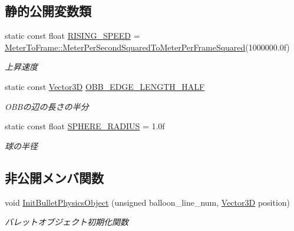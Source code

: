 \subsection*{静的公開変数類}
\begin{DoxyCompactItemize}
\item 
static const float \mbox{\hyperlink{class_balloon_a206b548c1ee7cf44616dbd2a0d7cc758}{R\+I\+S\+I\+N\+G\+\_\+\+S\+P\+E\+ED}} = \mbox{\hyperlink{class_meter_to_frame_ac3292be31b35e97027a65b4c74763ebe}{Meter\+To\+Frame\+::\+Meter\+Per\+Second\+Squared\+To\+Meter\+Per\+Frame\+Squared}}(1000000.\+0f)
\begin{DoxyCompactList}\small\item\em 上昇速度 \end{DoxyCompactList}\item 
static const \mbox{\hyperlink{class_vector3_d}{Vector3D}} \mbox{\hyperlink{class_balloon_a72e9f550154e31339200686a7b9dcdc2}{O\+B\+B\+\_\+\+E\+D\+G\+E\+\_\+\+L\+E\+N\+G\+T\+H\+\_\+\+H\+A\+LF}}
\begin{DoxyCompactList}\small\item\em O\+B\+Bの辺の長さの半分 \end{DoxyCompactList}\item 
static const float \mbox{\hyperlink{class_balloon_ae8db75393edbab7355e4d4df08a56e45}{S\+P\+H\+E\+R\+E\+\_\+\+R\+A\+D\+I\+US}} = 1.\+0f
\begin{DoxyCompactList}\small\item\em 球の半径 \end{DoxyCompactList}\end{DoxyCompactItemize}
\subsection*{非公開メンバ関数}
\begin{DoxyCompactItemize}
\item 
void \mbox{\hyperlink{class_balloon_aa7f08fc99964ad4db7cbe2292de279bc}{Init\+Bullet\+Physics\+Object}} (unsigned balloon\+\_\+line\+\_\+num, \mbox{\hyperlink{class_vector3_d}{Vector3D}} position)
\begin{DoxyCompactList}\small\item\em バレットオブジェクト初期化関数 \end{DoxyCompactList}\end{DoxyCompactItemize}
